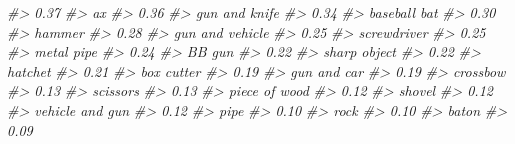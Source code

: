 \documentclass[
]{krantz}
\makeatletter
\newenvironment{Shaded}{\begin{snugshade}}{\end{snugshade}}
\newcommand{\CommentTok}[1]{\textcolor[rgb]{0.37,0.37,0.37}{\textit{#1}}}
\newenvironment{kframe}{%
\medskip{}
\setlength{\fboxsep}{.8em}
 \def\at@end@of@kframe{}%
 \ifinner\ifhmode%
  \def\at@end@of@kframe{\end{minipage}}%
  \begin{minipage}{\columnwidth}%
 \fi\fi%
 \def\FrameCommand##1{\hskip\@totalleftmargin \hskip-\fboxsep
 \colorbox{shadecolor}{##1}\hskip-\fboxsep
     \hskip-\linewidth \hskip-\@totalleftmargin \hskip\columnwidth}%
 \MakeFramed {\advance\hsize-\width
   \@totalleftmargin\z@ \linewidth\hsize
   \@setminipage}}%
 {\par\unskip\endMakeFramed%
 \at@end@of@kframe}
\renewenvironment{Shaded}{\begin{kframe}}{\end{kframe}}
\makeatother
\begin{document}
\begin{Shaded}
\begin{Highlighting}[]
\CommentTok{\#\textgreater{}                             0.37 }
\CommentTok{\#\textgreater{}                               ax }
\CommentTok{\#\textgreater{}                             0.36 }
\CommentTok{\#\textgreater{}                    gun and knife }
\CommentTok{\#\textgreater{}                             0.34 }
\CommentTok{\#\textgreater{}                     baseball bat }
\CommentTok{\#\textgreater{}                             0.30 }
\CommentTok{\#\textgreater{}                           hammer }
\CommentTok{\#\textgreater{}                             0.28 }
\CommentTok{\#\textgreater{}                  gun and vehicle }
\CommentTok{\#\textgreater{}                             0.25 }
\CommentTok{\#\textgreater{}                      screwdriver }
\CommentTok{\#\textgreater{}                             0.25 }
\CommentTok{\#\textgreater{}                       metal pipe }
\CommentTok{\#\textgreater{}                             0.24 }
\CommentTok{\#\textgreater{}                           BB gun }
\CommentTok{\#\textgreater{}                             0.22 }
\CommentTok{\#\textgreater{}                     sharp object }
\CommentTok{\#\textgreater{}                             0.22 }
\CommentTok{\#\textgreater{}                          hatchet }
\CommentTok{\#\textgreater{}                             0.21 }
\CommentTok{\#\textgreater{}                       box cutter }
\CommentTok{\#\textgreater{}                             0.19 }
\CommentTok{\#\textgreater{}                      gun and car }
\CommentTok{\#\textgreater{}                             0.19 }
\CommentTok{\#\textgreater{}                         crossbow }
\CommentTok{\#\textgreater{}                             0.13 }
\CommentTok{\#\textgreater{}                         scissors }
\CommentTok{\#\textgreater{}                             0.13 }
\CommentTok{\#\textgreater{}                    piece of wood }
\CommentTok{\#\textgreater{}                             0.12 }
\CommentTok{\#\textgreater{}                           shovel }
\CommentTok{\#\textgreater{}                             0.12 }
\CommentTok{\#\textgreater{}                  vehicle and gun }
\CommentTok{\#\textgreater{}                             0.12 }
\CommentTok{\#\textgreater{}                             pipe }
\CommentTok{\#\textgreater{}                             0.10 }
\CommentTok{\#\textgreater{}                             rock }
\CommentTok{\#\textgreater{}                             0.10 }
\CommentTok{\#\textgreater{}                            baton }
\CommentTok{\#\textgreater{}                             0.09 }

\end{Highlighting}
\end{Shaded}
\end{document}
